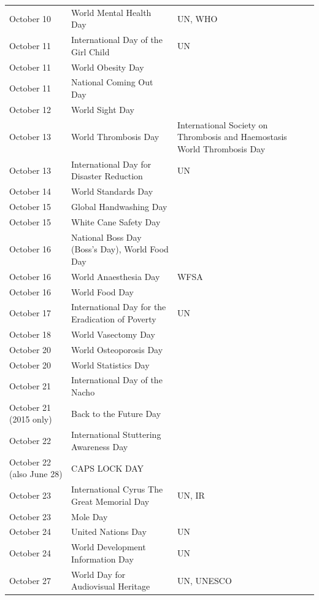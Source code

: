 \documentclass[
  openany]{book}
\begin{document}
\begin{longtable}[t]{>{\raggedright\arraybackslash}p{8em}>{\raggedright\arraybackslash}p{18em}>{\raggedright\arraybackslash}p{10em}}
October 10 & World Mental Health Day & UN, WHO\\
\rowcolor{gray!6}  October 11 & International Day of the Girl Child & UN\\
October 11 & World Obesity Day & \\
\addlinespace
\rowcolor{gray!6}  October 11 & National Coming Out Day & \\
October 12 & World Sight Day & \\
\rowcolor{gray!6}  October 13 & World Thrombosis Day & International Society on Thrombosis and Haemostasis World Thrombosis Day\\
October 13 & International Day for Disaster Reduction & UN\\
\rowcolor{gray!6}  October 14 & World Standards Day & \\
\addlinespace
October 15 & Global Handwashing Day & \\
\rowcolor{gray!6}  October 15 & White Cane Safety Day & \\
October 16 & National Boss Day (Boss's Day), World Food Day & \\
\rowcolor{gray!6}  October 16 & World Anaesthesia Day & WFSA\\
October 16 & World Food Day & \\
\addlinespace
\rowcolor{gray!6}  October 17 & International Day for the Eradication of Poverty & UN\\
October 18 & World Vasectomy Day & \\
\rowcolor{gray!6}  October 20 & World Osteoporosis Day & \\
October 20 & World Statistics Day & \\
\rowcolor{gray!6}  October 21 & International Day of the Nacho & \\
\addlinespace
October 21 (2015 only) & Back to the Future Day & \\
\rowcolor{gray!6}  October 22 & International Stuttering Awareness Day & \\
October 22 (also June 28) & CAPS LOCK DAY & \\
\rowcolor{gray!6}  October 23 & International Cyrus The Great Memorial Day & UN, IR\\
October 23 & Mole Day & \\
\addlinespace
\rowcolor{gray!6}  October 24 & United Nations Day & UN\\
October 24 & World Development Information Day & UN\\
\rowcolor{gray!6}  October 27 & World Day for Audiovisual Heritage & UN, UNESCO\\

\end{longtable}
\end{document}
